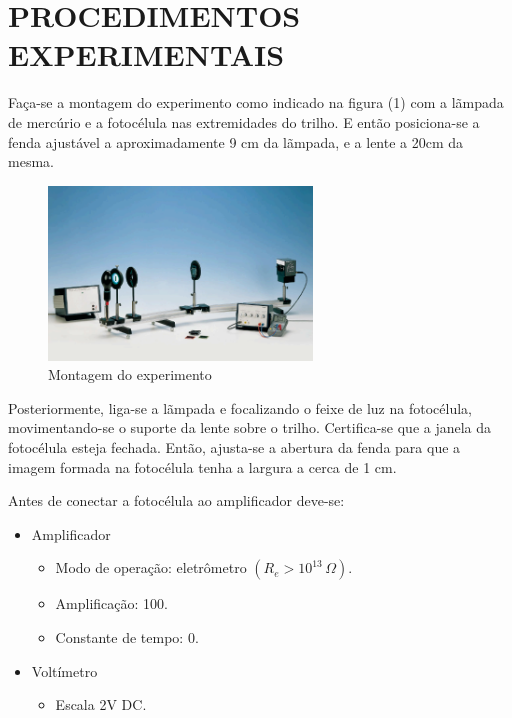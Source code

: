 \documentclass[10pt,twocolumn,letterpaper]{article}
\begin{document}

\section{PROCEDIMENTOS EXPERIMENTAIS}

\hspace{1cm} Faça-se a montagem do experimento como indicado na figura (1) com a lãmpada de mercúrio e a fotocélula nas extremidades do trilho. E então posiciona-se a fenda ajustável a aproximadamente 9 cm da lãmpada, e a lente a 20cm da mesma. 

\begin{figure}[h]
    \centering
    \includegraphics[width=7cm]{Imagem1.png}
    \caption{Montagem do experimento}
    \label{fig:label}
\end{figure}

\hspace{1cm} Posteriormente, liga-se a lãmpada e focalizando o feixe de luz na fotocélula, movimentando-se o suporte da lente sobre o trilho. Certifica-se que a janela da fotocélula esteja fechada. Então, ajusta-se a abertura da fenda para que a imagem formada na fotocélula tenha a largura a cerca de 1 cm. 

\noindent Antes de conectar a fotocélula ao amplificador deve-se:

\begin{itemize}
    \item Amplificador
    \begin{itemize}
        \item Modo de operação: eletrômetro $(R_e > 10^{13} \, \Omega)$.
        \item Amplificação: 100.
        \item Constante de tempo: 0.
    \end{itemize}
    \item Voltímetro
    \begin{itemize}
        \item Escala 2V DC.
    \end{itemize}
\end{itemize}
\end{document}
